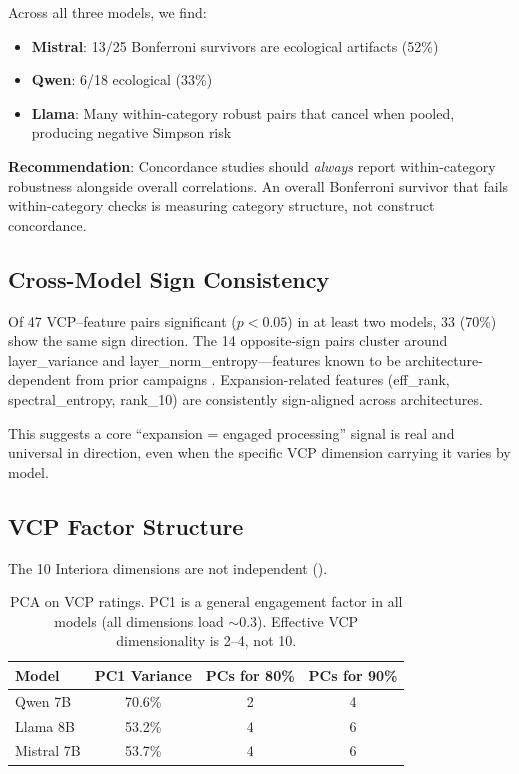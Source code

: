 \documentclass[11pt,a4paper]{article}
\begin{document}
Across all three models, we find:

\begin{itemize}
    \item \textbf{Mistral}: 13/25 Bonferroni survivors are ecological artifacts (52\%)
    \item \textbf{Qwen}: 6/18 ecological (33\%)
    \item \textbf{Llama}: Many within-category robust pairs that cancel when pooled, producing negative Simpson risk
\end{itemize}

\textbf{Recommendation}: Concordance studies should \emph{always} report within-category robustness alongside overall correlations. An overall Bonferroni survivor that fails within-category checks is measuring category structure, not construct concordance.

\subsection{Cross-Model Sign Consistency}

Of 47 VCP--feature pairs significant ($p < 0.05$) in at least two models, 33 (70\%) show the same sign direction. The 14 opposite-sign pairs cluster around layer\_variance and layer\_norm\_entropy---features known to be architecture-dependent from prior campaigns \citep{lyra2026campaign3}. Expansion-related features (eff\_rank, spectral\_entropy, rank\_10) are consistently sign-aligned across architectures.

This suggests a core ``expansion = engaged processing'' signal is real and universal in direction, even when the specific VCP dimension carrying it varies by model.

\subsection{VCP Factor Structure}
\label{sec:factor}

The 10 Interiora dimensions are not independent ().

\begin{table}[H]
\centering
\caption{PCA on VCP ratings. PC1 is a general engagement factor in all models (all dimensions load $\sim$0.3). Effective VCP dimensionality is 2--4, not 10.}
\label{tab:pca}
\begin{tabular}{lccc}
\toprule
\textbf{Model} & \textbf{PC1 Variance} & \textbf{PCs for 80\%} & \textbf{PCs for 90\%} \\
\midrule
Qwen 7B    & 70.6\% & 2 & 4 \\
Llama 8B   & 53.2\% & 4 & 6 \\
Mistral 7B & 53.7\% & 4 & 6 \\
\bottomrule
\end{tabular}
\end{table}
\end{document}
